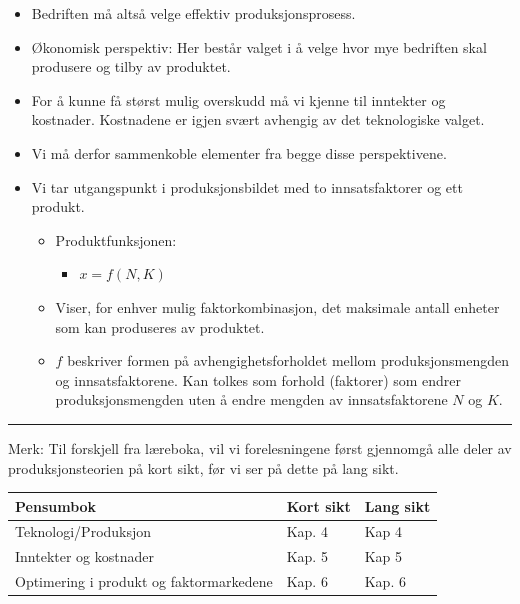 \documentclass[
  letterpaper,
  DIV=11,
  numbers=noendperiod]{scrartcl}
\providecommand{\tightlist}{%
  \setlength{\itemsep}{0pt}\setlength{\parskip}{0pt}}\usepackage{longtable,booktabs,array}
\begin{document}
\begin{itemize}
\item
  Bedriften må altså velge effektiv produksjonsprosess.
\item
  Økonomisk perspektiv: Her består valget i å velge hvor mye bedriften
  skal produsere og tilby av produktet.
\item
  For å kunne få størst mulig overskudd må vi kjenne til inntekter og
  kostnader. Kostnadene er igjen svært avhengig av det teknologiske
  valget.
\item
  Vi må derfor sammenkoble elementer fra begge disse perspektivene.
\item
  Vi tar utgangspunkt i produksjonsbildet med to innsatsfaktorer og ett
  produkt.

  \begin{itemize}
  \tightlist
  \item
    Produktfunksjonen:

    \begin{itemize}
    \tightlist
    \item
      \(x = f(N, K)\)
    \end{itemize}
  \item
    Viser, for enhver mulig faktorkombinasjon, det maksimale antall
    enheter som kan produseres av produktet.
  \item
    \(f\) beskriver formen på avhengighetsforholdet mellom
    produksjonsmengden og innsatsfaktorene. Kan tolkes som forhold
    (faktorer) som endrer produksjonsmengden uten å endre mengden av
    innsatsfaktorene \(N\) og \(K\).
  \end{itemize}
\end{itemize}

\begin{center}\rule{0.5\linewidth}{0.5pt}\end{center}

Merk: Til forskjell fra læreboka, vil vi forelesningene først gjennomgå
alle deler av produksjonsteorien på kort sikt, før vi ser på dette på
lang sikt.

\begin{longtable}[]{@{}lll@{}}
\toprule\noalign{}
Pensumbok & Kort sikt & Lang sikt \\
\midrule\noalign{}
\endhead
\bottomrule\noalign{}
\endlastfoot
Teknologi/Produksjon & Kap. 4 & Kap 4 \\
Inntekter og kostnader & Kap. 5 & Kap 5 \\
Optimering i produkt og faktormarkedene & Kap. 6 & Kap. 6 \\
\end{longtable}
\end{document}
